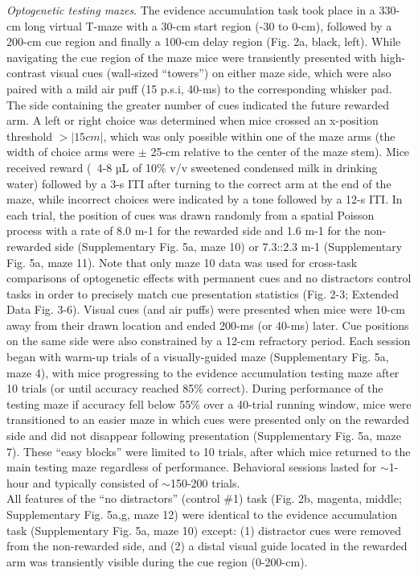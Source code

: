 \textit{Optogenetic testing mazes}. The evidence accumulation task took place in a 330-cm long virtual T-maze with a 30-cm start region (-30 to 0-cm), followed by a 200-cm cue region and finally a 100-cm delay region (Fig. 2a, black, left). While navigating the cue region of the maze mice were transiently presented with high-contrast visual cues (wall-sized “towers”) on either maze side, which were also paired with a mild air puff (15 p.s.i, 40-ms) to the corresponding whisker pad. The side containing the greater number of cues indicated the future rewarded arm. A left or right choice was determined when mice crossed an x-position threshold $> |15cm|$, which was only possible within one of the maze arms (the width of choice arms were $\pm$ 25-cm relative to the center of the maze stem). Mice received reward (~4-8 µL of 10\% v/v sweetened condensed milk in drinking water) followed by a 3-s ITI after turning to the correct arm at the end of the maze, while incorrect choices were indicated by a tone followed by a 12-s ITI. In each trial, the position of cues was drawn randomly from a spatial Poisson process with a rate of 8.0 m-1 for the rewarded side and 1.6 m-1 for the non-rewarded side (Supplementary Fig. 5a, maze 10) or 7.3::2.3 m-1 (Supplementary Fig. 5a, maze 11). Note that only maze 10 data was used for cross-task comparisons of optogenetic effects with permanent cues and no distractors control tasks in order to precisely match cue presentation statistics (Fig. 2-3; Extended Data Fig. 3-6). Visual cues (and air puffs) were presented when mice were 10-cm away from their drawn location and ended 200-ms (or 40-ms) later. Cue positions on the same side were also constrained by a 12-cm refractory period. Each session began with warm-up trials of a visually-guided maze (Supplementary Fig. 5a, maze 4), with mice progressing to the evidence accumulation testing maze after 10 trials (or until accuracy reached 85\% correct). During performance of the testing maze if accuracy fell below 55\% over a 40-trial running window, mice were transitioned to an easier maze in which cues were presented only on the rewarded side and did not disappear following presentation (Supplementary Fig. 5a, maze 7). These “easy blocks” were limited to 10 trials, after which mice returned to the main testing maze regardless of performance. Behavioral sessions lasted for $\sim$1-hour and typically consisted of $\sim$150-200 trials. \\
All features of the “no distractors” (control \#1) task (Fig. 2b, magenta, middle; Supplementary Fig. 5a,g, maze 12) were identical to the evidence accumulation task (Supplementary Fig. 5a, maze 10) except: (1) distractor cues were removed from the non-rewarded side, and (2) a distal visual guide located in the rewarded arm was transiently visible during the cue region (0-200-cm). \\
